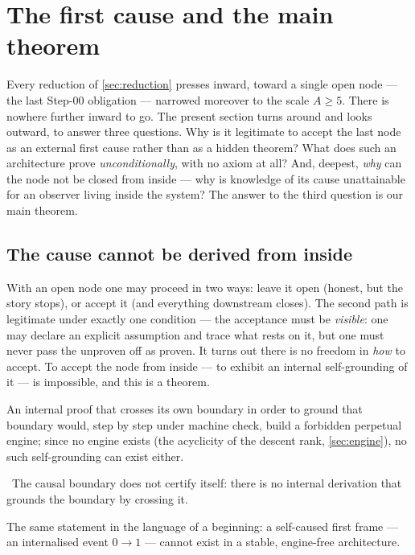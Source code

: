 \section{The first cause and the main theorem}\label{sec:firstcause}

Every reduction of \cref{sec:reduction} presses inward, toward a single open node --- the last
Step-00 obligation --- narrowed moreover to the scale $A \ge 5$. There is nowhere further inward to
go. The present section turns around and looks outward, to answer three questions. Why is it
legitimate to accept the last node as an external first cause rather than as a hidden theorem? What
does such an architecture prove \emph{unconditionally}, with no axiom at all? And, deepest,
\emph{why} can the node not be closed from inside --- why is knowledge of its cause unattainable for
an observer living inside the system? The answer to the third question is our main theorem.

\subsection{The cause cannot be derived from inside}

With an open node one may proceed in two ways: leave it open (honest, but the story stops), or
accept it (and everything downstream closes). The second path is legitimate under exactly one
condition --- the acceptance must be \emph{visible}: one may declare an explicit assumption and
trace what rests on it, but one must never pass the unproven off as proven. It turns out there is no
freedom in \emph{how} to accept. To accept the node from inside --- to exhibit an internal
self-grounding of it --- is impossible, and this is a theorem.

An internal proof that crosses its own boundary in order to ground that boundary would, step by step
under machine check, build a forbidden perpetual engine; since no engine exists (the acyclicity of
the descent rank, \cref{sec:engine}), no such self-grounding can exist either.

\begin{theorem}\label{thm:no_internalSelfDerivation_step00CausalClosure}
\green{}\ The causal boundary does not certify itself: there is no internal derivation that grounds
the boundary by crossing it. 
\end{theorem}

The same statement in the language of a beginning: a self-caused first frame --- an internalised
event $0 \to 1$ --- cannot exist in a stable, engine-free architecture.

